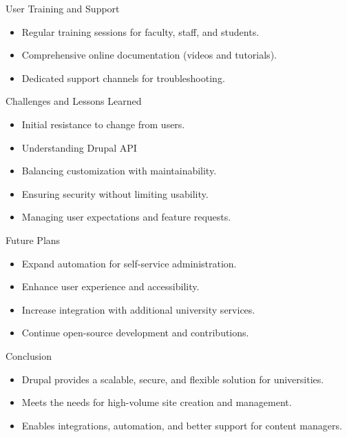 \begin{frame}{User Training and Support}
    \begin{itemize}
        \item Regular training sessions for faculty, staff, and students.
        \item Comprehensive online documentation (videos and tutorials).
        \item Dedicated support channels for troubleshooting.
    \end{itemize}
\end{frame}

\begin{frame}{Challenges and Lessons Learned}
    \begin{itemize}
        \item Initial resistance to change from users.
        \item Understanding Drupal API
        \item Balancing customization with maintainability.
        \item Ensuring security without limiting usability.
        \item Managing user expectations and feature requests.
    \end{itemize}
\end{frame}

\begin{frame}{Future Plans}
    \begin{itemize}
        \item Expand automation for self-service administration.
        \item Enhance user experience and accessibility.
        \item Increase integration with additional university services.
        \item Continue open-source development and contributions.
    \end{itemize}
\end{frame}

\begin{frame}{Conclusion}
    \begin{itemize}
        \item Drupal provides a scalable, secure, and flexible solution for universities.
        \item Meets the needs for high-volume site creation and management.
        \item Enables integrations, automation, and better support for content managers.
    \end{itemize}
\end{frame}